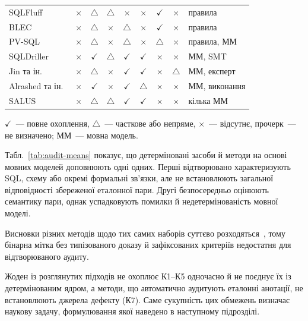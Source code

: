 \documentclass[a4paper,14pt,oneside]{extreport}
\begin{document}
\begin{table}[htbp]
\begin{tabularx}{\textwidth}{@{}>{\raggedright\arraybackslash}X ccccccc >{\raggedright\arraybackslash}p{3.0cm}@{}}
    SQLFluff~\cite{sqlfluff} &
    $\times$ & $\triangle$ & $\triangle$ & $\times$ & $\times$ & $\checkmark$ & $\times$ & правила \\
    BLEC~\cite{shu2021blec} &
    $\times$ & $\triangle$ & $\times$ & $\triangle$ & $\times$ & $\checkmark$ & $\times$ & правила \\
    PV-SQL~\cite{tian2026pvsql} &
    $\times$ & $\triangle$ & $\times$ & $\triangle$ & $\times$ & $\triangle$ & $\times$ & правила, ММ \\
    \midrule
    SQLDriller~\cite{yang2025sqldriller} &
    $\times$ & $\checkmark$ & $\triangle$ & $\checkmark$ & $\checkmark$ & $\times$ & $\times$ & ММ, SMT \\
    Jin та ін.~\cite{jin2026annotation} &
    $\times$ & $\triangle$ & $\times$ & $\checkmark$ & $\checkmark$ & $\times$ & $\triangle$ & ММ, експерт \\
    Alrashed та ін.~\cite{alrashed2026verification} &
    $\times$ & $\checkmark$ & $\times$ & $\checkmark$ & $\triangle$ & $\times$ & $\times$ & ММ, виконання \\
    SALUS~\cite{zhou2026salus} &
    $\times$ & $\triangle$ & $\triangle$ & $\checkmark$ & $\checkmark$ & $\times$ & $\times$ & кілька ММ \\
    \bottomrule
  \end{tabularx}

  \vspace{4pt}
  {\footnotesize\raggedright
  $\checkmark$~--- повне охоплення, $\triangle$~--- часткове або непряме, $\times$~--- відсутнє, прочерк~--- не визначено; ММ~--- мовна модель.\par}
\end{table}

Табл.~\ref{tab:audit-means} показує, що детерміновані засоби й методи на основі мовних моделей доповнюють одні одних. Перші відтворювано характеризують SQL, схему або окремі формальні зв'язки, але не встановлюють загальної відповідності збереженої еталонної пари. Другі безпосередньо оцінюють семантику пари, однак успадковують помилки й недетермінованість мовної моделі.

Висновки різних методів щодо тих самих наборів суттєво розходяться~\cite{zhou2026salus,yang2025sqldriller}, тому бінарна мітка без типізованого доказу й зафіксованих критеріїв недостатня для відтворюваного аудиту.

Жоден із розглянутих підходів не охоплює К1--К5 одночасно й не поєднує їх із детермінованим ядром, а методи, що автоматично аудитують еталонні анотації, не встановлюють джерела дефекту (К7). Саме сукупність цих обмежень визначає наукову задачу, формулювання якої наведено в наступному підрозділі.
\end{document}
